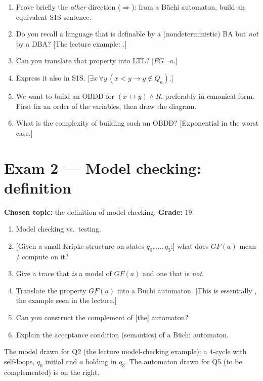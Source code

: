 \documentclass[oneside]{academica}
\begin{document}
\begin{enumerate}
  \item Prove briefly the \emph{other} direction ($\Rightarrow$): from a
    Büchi automaton, build an equivalent S1S sentence.
  \item Do you recall a language that is definable by a (nondeterministic)
    BA but \emph{not} by a DBA? [The lecture example: .]
  \item Can you translate that property into LTL? [$FG\,\neg a$.]
  \item Express it also in S1S. [$\exists x\,\forall y\,(x<y \rightarrow
    y\notin Q_a)$.]
  \item We want to build an OBDD for $(x \leftrightarrow y)\wedge R$,
    preferably in canonical form. First fix an order of the variables,
    then draw the diagram.
  \item What is the complexity of building such an OBDD? [Exponential in
    the worst case.]
\end{enumerate}

\section{Exam 2 --- Model checking: definition}
\textbf{Chosen topic:} the definition of model checking.\quad
\textbf{Grade:} $19$.

\begin{enumerate}
  \item Model checking vs.\ testing.
  \item {}[Given a small Kripke structure on states $q_0,\dots,q_3$:] what
    does $GF(a)$ mean / compute on it?
  \item Give a trace that \emph{is} a model of $GF(a)$ and one that is
    \emph{not}.
  \item Translate the property $GF(a)$ into a Büchi automaton. [This is
    essentially , the example seen in the
    lecture.]
  \item Can you construct the complement of [the] automaton?
  \item Explain the acceptance condition (semantics) of a Büchi
    automaton.
\end{enumerate}

\noindent The model drawn for Q2 (the lecture model-checking example): a
$4$-cycle with self-loops, $q_0$ initial and $a$ holding in $q_3$. The
automaton drawn for Q5 (to be complemented) is on the right.
\end{document}
